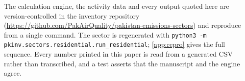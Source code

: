 \documentclass[5p,times,authoryear]{elsarticle}
\begin{document}
The calculation engine, the activity data and every output quoted here are version-controlled
in the inventory repository (\url{https://github.com/PakAirQuality/pakistan-emissions-sectors})
and reproduce from a single command. The sector is regenerated with
\texttt{python3 -m pkinv.sectors.residential.run\_residential}; \ref{app:repro} gives the full
sequence. Every number printed in this paper is read from a generated CSV rather than
transcribed, and a test asserts that the manuscript and the engine agree.




\appendix
\renewcommand{\thetable}{\arabic{table}}%
\renewcommand{\thefigure}{\arabic{figure}}%

\FloatBarrier

\FloatBarrier

\FloatBarrier

\FloatBarrier

\FloatBarrier
\end{document}

